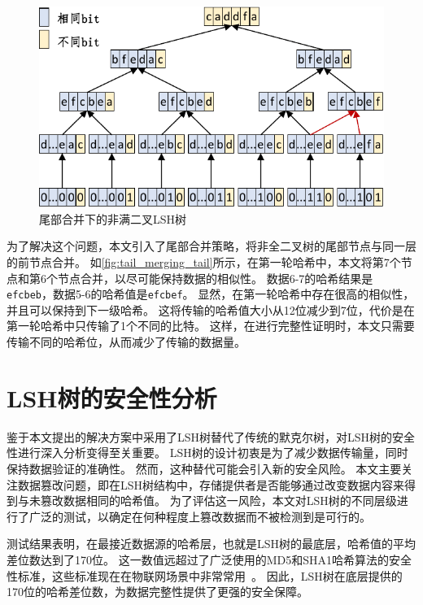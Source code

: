 \begin{figure}[t]
    \centering
	\begin{minipage}{0.8\linewidth}
        \centering
        \includegraphics[width=1\textwidth]{figures/timechain/tail_merging_tail.pdf}
	\end{minipage}
	\caption{尾部合并下的非满二叉LSH树}
	\label{fig:tail_merging_tail}
\end{figure}
为了解决这个问题，本文引入了尾部合并策略，将非全二叉树的尾部节点与同一层的前节点合并。
如\autoref{fig:tail_merging_tail}所示，在第一轮哈希中，本文将第7个节点和第6个节点合并，以尽可能保持数据的相似性。
数据6-7的哈希结果是\texttt{efcbeb}，数据5-6的哈希值是\texttt{efcbef}。
显然，在第一轮哈希中存在很高的相似性，并且可以保持到下一级哈希。
这将传输的哈希值大小从12位减少到7位，代价是在第一轮哈希中只传输了1个不同的比特。
这样，在进行完整性证明时，本文只需要传输不同的哈希位，从而减少了传输的数据量。

\section{LSH树的安全性分析}
鉴于本文提出的解决方案中采用了LSH树替代了传统的默克尔树，对LSH树的安全性进行深入分析变得至关重要。
LSH树的设计初衷是为了减少数据传输量，同时保持数据验证的准确性。
然而，这种替代可能会引入新的安全风险。
本文主要关注数据篡改问题，即在LSH树结构中，存储提供者是否能够通过改变数据内容来得到与未篡改数据相同的哈希值。
为了评估这一风险，本文对LSH树的不同层级进行了广泛的测试，以确定在何种程度上篡改数据而不被检测到是可行的。

测试结果表明，在最接近数据源的哈希层，也就是LSH树的最底层，哈希值的平均差位数达到了170位。
这一数值远超过了广泛使用的MD5和SHA1哈希算法的安全性标准，这些标准现在在物联网场景中非常常用~\cite{chi2017hashing,landge2018secured}。
因此，LSH树在底层提供的170位的哈希差位数，为数据完整性提供了更强的安全保障。

